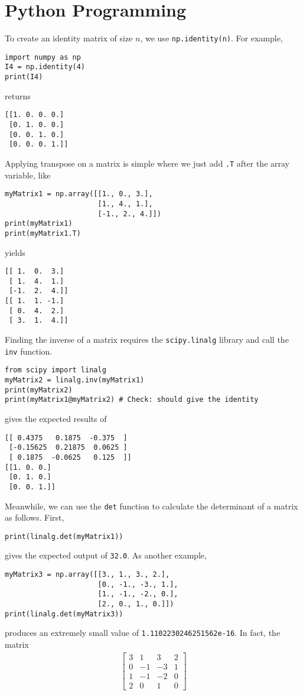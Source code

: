 \section{Python Programming}
\label{section:ch2python}
To create an identity matrix of size $n$, we use \verb|np.identity(n)|. For example,
\begin{lstlisting}
import numpy as np
I4 = np.identity(4)
print(I4)
\end{lstlisting}
returns
\begin{lstlisting}
[[1. 0. 0. 0.]
 [0. 1. 0. 0.]
 [0. 0. 1. 0.]
 [0. 0. 0. 1.]]
\end{lstlisting}
Applying transpose on a matrix is simple where we just add \verb|.T| after the array variable, like
\begin{lstlisting}
myMatrix1 = np.array([[1., 0., 3.],
                      [1., 4., 1.],
                      [-1., 2., 4.]])
print(myMatrix1)
print(myMatrix1.T)
\end{lstlisting}
yields
\begin{lstlisting}
[[ 1.  0.  3.]
 [ 1.  4.  1.]
 [-1.  2.  4.]]
[[ 1.  1. -1.]
 [ 0.  4.  2.]
 [ 3.  1.  4.]]
\end{lstlisting}
Finding the inverse of a matrix requires the \verb|scipy.linalg| library and call the \verb|inv| function.
\begin{lstlisting}
from scipy import linalg
myMatrix2 = linalg.inv(myMatrix1)
print(myMatrix2)
print(myMatrix1@myMatrix2) # Check: should give the identity
\end{lstlisting}
gives the expected results of
\begin{lstlisting}
[[ 0.4375   0.1875  -0.375  ]
 [-0.15625  0.21875  0.0625 ]
 [ 0.1875  -0.0625   0.125  ]]
[[1. 0. 0.]
 [0. 1. 0.]
 [0. 0. 1.]]
\end{lstlisting}
Meanwhile, we can use the \verb|det| function to calculate the determinant of a matrix as follows. First,
\begin{lstlisting}
print(linalg.det(myMatrix1))
\end{lstlisting}
gives the expected output of \verb|32.0|. As another example,
\begin{lstlisting}
myMatrix3 = np.array([[3., 1., 3., 2.],
                      [0., -1., -3., 1.],
                      [1., -1., -2., 0.],
                      [2., 0., 1., 0.]])
print(linalg.det(myMatrix3))  
\end{lstlisting}
produces an extremely small value of \verb|1.1102230246251562e-16|. In fact, the matrix
\begin{align*}
\begin{bmatrix}
3 & 1 & 3 & 2 \\
0 & -1 & -3 & 1 \\
1 & -1 & -2 & 0 \\
2 & 0 & 1 & 0    
\end{bmatrix}
\end{align*}
